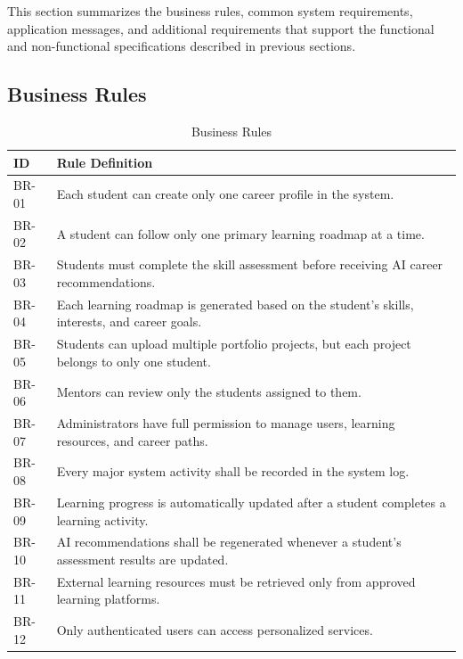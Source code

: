 This section summarizes the business rules, common system requirements,
application messages, and additional requirements that support the
functional and non-functional specifications described in previous sections.

\subsection{Business Rules}

\begin{table}[H]
\centering
\caption{Business Rules}
\begin{tabularx}{\textwidth}{|p{2cm}|X|}
\hline
\rowcolor{gray!20}
\textbf{ID} & \textbf{Rule Definition} \\
\hline

BR-01 &
Each student can create only one career profile in the system. \\
\hline

BR-02 &
A student can follow only one primary learning roadmap at a time. \\
\hline

BR-03 &
Students must complete the skill assessment before receiving AI career recommendations. \\
\hline

BR-04 &
Each learning roadmap is generated based on the student's skills, interests, and career goals. \\
\hline

BR-05 &
Students can upload multiple portfolio projects, but each project belongs to only one student. \\
\hline

BR-06 &
Mentors can review only the students assigned to them. \\
\hline

BR-07 &
Administrators have full permission to manage users, learning resources, and career paths. \\
\hline

BR-08 &
Every major system activity shall be recorded in the system log. \\
\hline

BR-09 &
Learning progress is automatically updated after a student completes a learning activity. \\
\hline

BR-10 &
AI recommendations shall be regenerated whenever a student's assessment results are updated. \\
\hline

BR-11 &
External learning resources must be retrieved only from approved learning platforms. \\
\hline

BR-12 &
Only authenticated users can access personalized services. \\
\hline

\end{tabularx}
\end{table}

